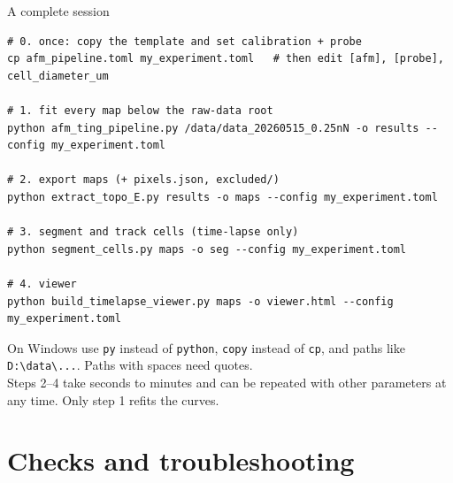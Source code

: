 \documentclass[aspectratio=169,9pt]{beamer}
\begin{document}
\begin{frame}[fragile]{A complete session}
\begin{lstlisting}
# 0. once: copy the template and set calibration + probe
cp afm_pipeline.toml my_experiment.toml   # then edit [afm], [probe], cell_diameter_um

# 1. fit every map below the raw-data root
python afm_ting_pipeline.py /data/data_20260515_0.25nN -o results --config my_experiment.toml

# 2. export maps (+ pixels.json, excluded/)
python extract_topo_E.py results -o maps --config my_experiment.toml

# 3. segment and track cells (time-lapse only)
python segment_cells.py maps -o seg --config my_experiment.toml

# 4. viewer
python build_timelapse_viewer.py maps -o viewer.html --config my_experiment.toml
\end{lstlisting}
\small
On Windows use \texttt{py} instead of \texttt{python}, \texttt{copy} instead of \texttt{cp}, and paths like \texttt{D:\textbackslash data\textbackslash ...}. Paths with spaces need quotes.\\[3pt]
Steps 2--4 take seconds to minutes and can be repeated with other parameters at any time. Only step 1 refits the curves.
\end{frame}

\section{Checks and troubleshooting}
\end{document}
